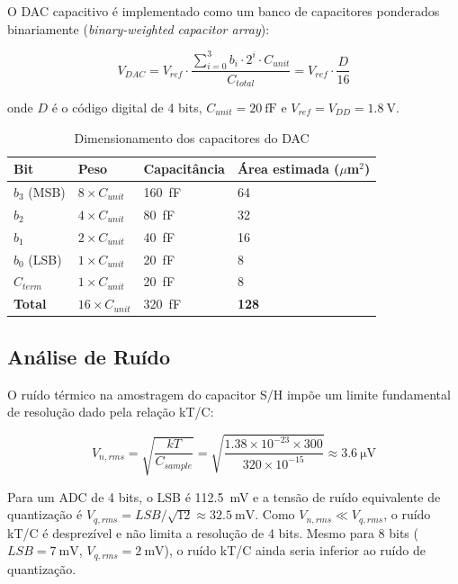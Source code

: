\documentclass[12pt,a4paper]{article}
\begin{document}
O DAC capacitivo é implementado como um banco de capacitores ponderados
binariamente (\textit{binary-weighted capacitor array}):

\begin{equation}
  V_{DAC} = V_{ref} \cdot \frac{\sum_{i=0}^{3} b_i \cdot 2^i \cdot C_{unit}}{C_{total}}
  = V_{ref} \cdot \frac{D}{16}
\end{equation}

\noindent onde $D$ é o código digital de 4 bits, $C_{unit} = \SI{20}{\femto\farad}$
e $V_{ref} = V_{DD} = \SI{1.8}{\volt}$.

\begin{table}[H]
  \centering
  \caption{Dimensionamento dos capacitores do DAC}
  \label{tab:dac_caps}
  \begin{tabular}{llll}
    \toprule
    \textbf{Bit} & \textbf{Peso} & \textbf{Capacitância} & \textbf{Área estimada ($\mu$m$^2$)} \\
    \midrule
    $b_3$ (MSB) & $8 \times C_{unit}$ & \SI{160}{\femto\farad} & 64 \\
    $b_2$       & $4 \times C_{unit}$ & \SI{80}{\femto\farad}  & 32 \\
    $b_1$       & $2 \times C_{unit}$ & \SI{40}{\femto\farad}  & 16 \\
    $b_0$ (LSB) & $1 \times C_{unit}$ & \SI{20}{\femto\farad}  & 8  \\
    $C_{term}$  & $1 \times C_{unit}$ & \SI{20}{\femto\farad}  & 8  \\
    \midrule
    \textbf{Total} & $16 \times C_{unit}$ & \SI{320}{\femto\farad} & \textbf{128} \\
    \bottomrule
  \end{tabular}
\end{table}

\subsection{Análise de Ruído}

O ruído térmico na amostragem do capacitor S/H impõe um limite fundamental
de resolução dado pela relação kT/C:

\begin{equation}
  V_{n,rms} = \sqrt{\frac{kT}{C_{sample}}} = \sqrt{\frac{1.38 \times 10^{-23} \times 300}{320 \times 10^{-15}}} \approx \SI{3.6}{\micro\volt}
\end{equation}

Para um ADC de 4 bits, o LSB é \SI{112.5}{\milli\volt} e a tensão de ruído
equivalente de quantização é $V_{q,rms} = LSB/\sqrt{12} \approx \SI{32.5}{\milli\volt}$.
Como $V_{n,rms} \ll V_{q,rms}$, o ruído kT/C é desprezível e não limita a
resolução de 4 bits. Mesmo para 8 bits ($LSB = \SI{7}{\milli\volt}$, $V_{q,rms} = \SI{2}{\milli\volt}$),
o ruído kT/C ainda seria inferior ao ruído de quantização.
\end{document}

